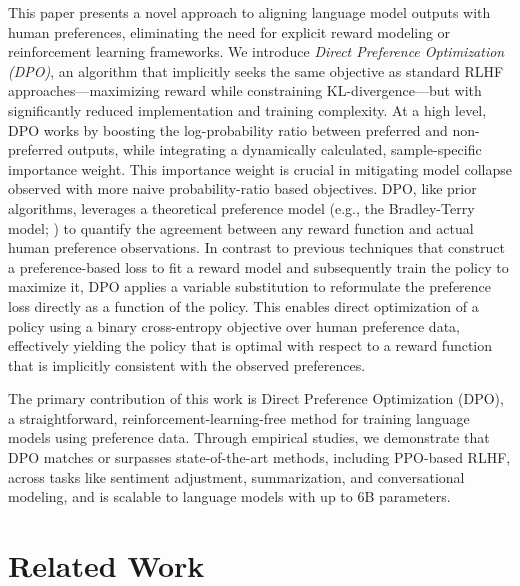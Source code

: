 This paper presents a novel approach to aligning language model outputs with human preferences, eliminating the need for explicit reward modeling or reinforcement learning frameworks. We introduce \textit{{Direct Preference Optimization} (DPO)}, an algorithm that implicitly seeks the same objective as standard RLHF approaches—maximizing reward while constraining KL-divergence—but with significantly reduced implementation and training complexity. At a high level, DPO works by boosting the log-probability ratio between preferred and non-preferred outputs, while integrating a dynamically calculated, sample-specific importance weight. This importance weight is crucial in mitigating model collapse observed with more naive probability-ratio based objectives. DPO, like prior algorithms, leverages a theoretical preference model (e.g., the Bradley-Terry model; \cite{bradley1952rankanalysis}) to quantify the agreement between any reward function and actual human preference observations. In contrast to previous techniques that construct a preference-based loss to fit a reward model and subsequently train the policy to maximize it, DPO applies a variable substitution to reformulate the preference loss directly as a function of the policy. This enables direct optimization of a policy using a binary cross-entropy objective over human preference data, effectively yielding the policy that is optimal with respect to a reward function that is implicitly consistent with the observed preferences.

The primary contribution of this work is Direct Preference Optimization (DPO), a straightforward, reinforcement-learning-free method for training language models using preference data. Through empirical studies, we demonstrate that DPO matches or surpasses state-of-the-art methods, including PPO-based RLHF, across tasks like sentiment adjustment, summarization, and conversational modeling, and is scalable to language models with up to 6B parameters.

\section{Related Work}

